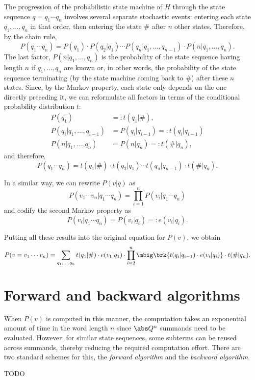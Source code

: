 The progression of the probabilistic state machine of $H$ through the state
sequence $q=q_1\cdots q_n$ involves several separate stochastic events:
entering each state $q_1,\ldots,q_n$ in that order, then entering the state
$\#$ after $n$ other states. Therefore, by the chain rule,
\[
 P(q_1\cdots q_n) = P(q_1) \cdot P(q_2|q_1) \cdots P(q_n|q_1,\ldots,q_{n-1}) \cdot P(n|q_1,\ldots,q_n).
\]
The last factor, $P(n|q_1,\ldots,q_n)$ is the probability of the state sequence
having length $n$ if $q_1,\ldots,q_n$ are known or, in other words, the
probability of the state sequence terminating (by the state machine coming back
to $\#$) after these $n$ states. Since, by the Markov property, each state only
depends on the one directly preceding it, we can reformulate all factors in
terms of the conditional probability distribution $t$:
\begin{align*}
 P(q_1) &=: t(q_1|\#), \\
 P(q_i|q_1,\ldots,q_{i-1}) &= P(q_i|q_{i-1}) =: t(q_i|q_{i-1}) \\
 P(n|q_1,\ldots,q_n) &= P(n|q_n) =: t(\#|q_n),
\end{align*}
and therefore,
\[
 P(q_1\cdots q_n) = t(q_1|\#) \cdot t(q_2|q_1) \cdots t(q_n|q_{n-1}) \cdot t(\#|q_n).
\]

In a similar way, we can rewrite $P(v|q)$ as
\[
 P(v_1\cdots v_n|q_1\cdots q_n) = \prod_{i=1}^n P(v_i|q_1\cdots q_n)
\]
and codify the second Markov property as
\[
 P(v_i|q_1\cdots q_n) = P(v_i|q_i) =: e(v_i|q_i).
\]

Putting all these results into the original equation for $P(v)$, we obtain
\[
 P(v=v_1\cdots v_n) = \sum_{q_1,\ldots,q_n} t(q_1|\#) \cdot e(v_1|q_1) \cdot \prod_{i=2}^n \mbig\brk{t(q_i|q_{i-1}) \cdot e(v_i|q_i)} \cdot t(\#|q_n).
\]

\section{Forward and backward algorithms}

When $P(v)$ is computed in this manner, the computation takes an exponential
amount of time in the word length $n$ since $\abs Q^n$ summands need to be
evaluated. However, for similar state sequences, some subterms can be reused
across summands, thereby reducing the required computation effort. There are
two standard schemes for this, the \emph{forward algorithm} and the
\emph{backward algorithm}.

{\color{red}TODO}
